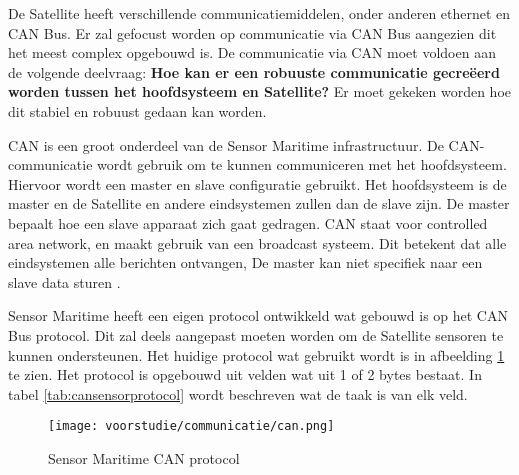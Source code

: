 De Satellite heeft verschillende communicatiemiddelen, onder anderen ethernet en CAN Bus. Er zal gefocust worden op communicatie via CAN Bus aangezien dit het meest complex opgebouwd is.  De communicatie via CAN moet voldoen aan de volgende deelvraag: \textbf{Hoe kan er een robuuste communicatie gecreëerd worden tussen het hoofdsysteem en Satellite?} Er moet gekeken worden hoe dit stabiel en robuust gedaan kan worden.\newline


\noindent CAN is een groot onderdeel van de Sensor Maritime infrastructuur. De CAN-communicatie wordt gebruik om te kunnen communiceren met het hoofdsysteem. Hiervoor wordt een master en slave configuratie gebruikt. Het hoofdsysteem is de master en de Satellite en andere eindsystemen zullen dan de slave zijn. De master bepaalt hoe een slave apparaat zich gaat gedragen. CAN staat voor controlled area network, en maakt gebruik van een broadcast systeem. Dit betekent dat alle eindsystemen alle berichten ontvangen, De master kan niet specifiek naar een slave data sturen \autocite{can}. \newline

\noindent Sensor Maritime heeft een eigen protocol ontwikkeld wat gebouwd is op het CAN Bus protocol. Dit zal deels aangepast moeten worden om de Satellite sensoren te kunnen ondersteunen. Het huidige protocol wat gebruikt wordt is in afbeelding \ref{fig:canprotocol} te zien. Het protocol is opgebouwd uit velden wat uit 1 of 2 bytes bestaat. In tabel \ref{tab:cansensorprotocol} wordt beschreven wat de taak is van elk veld.
\begin{figure}[h!]
	\centering
	\label{fig:canprotocol}
	\texttt{[image: voorstudie/communicatie/can.png]}
	\caption{Sensor Maritime CAN protocol}
\end{figure}

